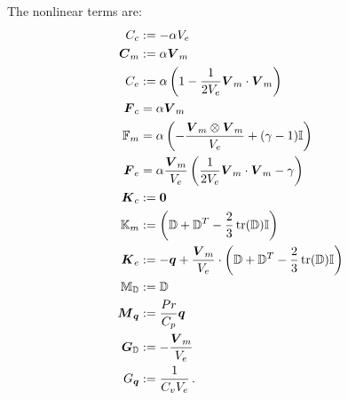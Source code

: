 \documentclass[Dissertation.tex]{subfiles}
\begin{document}
The nonlinear terms are:
\begin{align*}
C_c&:=-\alpha V_e\\
\bfC_m&:=\alpha\bfV_m\\
C_e&:=\alpha\LRp{1-\frac{1}{2V_e}\bfV_m\cdot\bfV_m}\\
\bfF_c&=\alpha\bfV_m\\
\mathbb{F}_m&=\alpha\LRp{-\frac{\bfV_m\otimes\bfV_m}{V_e}+(\gamma-1)\bbI}\\
\bfF_e&=\alpha\frac{\bfV_m}{V_e}\LRp{\frac{1}{2V_e}\bfV_m\cdot\bfV_m-\gamma}\\
\bfK_c&:=\boldsymbol 0\\
\bbK_m&:=\LRp{\bbD+\bbD^T-\frac{2}{3}\trace(\bbD)\bbI}\\
\bfK_e&:=-\bfq+\frac{\bfV_m}{V_e}\cdot\LRp{\bbD+\bbD^T-\frac{2}{3}\trace(\bbD)\bbI}\\
\bbM_{\bbD}&:=\bbD\\
\bfM_{\bfq}&:=\frac{Pr}{C_p}\bfq\\
\bfG_{\bbD}&:=-\frac{\bfV_m}{V_e}\\
G_{\bfq}&:=\frac{1}{C_vV_e}\,.
\end{align*}
\end{document}
